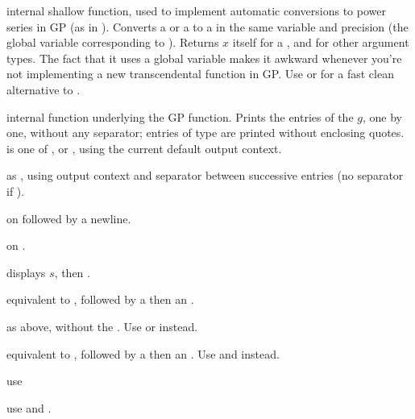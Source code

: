 
 internal shallow function, used to implement
automatic conversions to power series in GP (as in ).
Converts a  or a  to a  in the same variable and
precision  (the global variable corresponding to
). Returns $x$ itself for a , and 
for other argument types. The fact that it uses a global variable makes it
awkward whenever you're not implementing a new transcendental function in GP.
Use  or  for a fast clean alternative to
.


 internal function underlying the
 GP function. Prints the entries of the  $g$, one by one,
without any separator; entries of type  are printed without enclosing
quotes. \fl is one of ,  or , using the
current default output context.

 as
, using output context  and separator  between
successive entries (no separator if ).

  on
 followed by a newline.

  on
.

 displays $s$,
then .

 equivalent to , followed
by a  then an .

 as above, without the . Use
 or  instead.

 equivalent to , followed
by a  then an . Use  and
 instead.


 use 

 use  and
.

